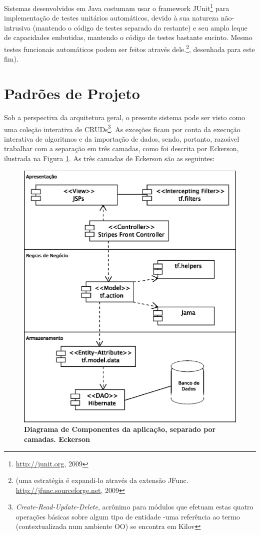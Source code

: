 \documentclass{abnt}
\begin{document}
	Sistemas desenvolvidos em Java costumam usar o framework JUnit\footnote{\url{http://junit.org}, 2009} para implementação de testes unitários automáticos, devido à sua natureza não-intrusiva (mantendo o código de testes separado do restante) e seu amplo leque de capacidades embutidas, mantendo o código de testes bastante sucinto. Mesmo testes funcionais automáticos podem ser feitos através dele.\footnote{(uma estratégia é expandi-lo através da extensão JFunc. \url{http://jfunc.sourceforge.net}, 2009}, desenhada para este fim).

\section{Padrões de Projeto}

	Sob a perspectiva da arquitetura geral, o presente sistema pode ser visto como uma coleção interativa de CRUDs\footnote{\textit{Create-Read-Update-Delete}, acrônimo para módulos que efetuam estas quatro operações básicas sobre algum tipo de entidade -uma referência ao termo (contextualizada num ambiente OO) se encontra em Kilov\cite{kilov_crud}}. As exceções ficam por conta da execução interativa de algoritmos e da importação de dados, sendo, portanto, razoável trabalhar com a separação em três camadas, como foi  descrita por Eckerson\cite{Eckerson1995}, ilustrada na Figura \ref{deployment}. As três camadas de Eckerson são as seguintes:

\begin{figure}
\begin{center}
\includegraphics[scale=0.8]{deployment.eps}
\caption{{\bf Diagrama de Componentes da aplicação, separado por camadas. Eckerson\cite{Eckerson1995}}}
\label{deployment}
\end{center}
\end{figure}
\end{document}
